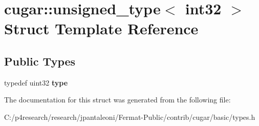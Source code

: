 \hypertarget{structcugar_1_1unsigned__type_3_01int32_01_4}{}\section{cugar\+:\+:unsigned\+\_\+type$<$ int32 $>$ Struct Template Reference}
\label{structcugar_1_1unsigned__type_3_01int32_01_4}
\subsection*{Public Types}
\begin{DoxyCompactItemize}
\item 
\mbox{\label{structcugar_1_1unsigned__type_3_01int32_01_4_ac110c41744506057b5cf591c908dab72}} 
typedef uint32 {\bfseries type}
\end{DoxyCompactItemize}


The documentation for this struct was generated from the following file\+:\begin{DoxyCompactItemize}
\item 
C\+:/p4research/research/jpantaleoni/\+Fermat-\/\+Public/contrib/cugar/basic/types.\+h\end{DoxyCompactItemize}
